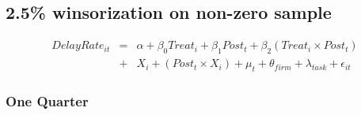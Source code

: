 \documentclass[
]{article}
\begin{document}
\hypertarget{winsorization-on-non-zero-sample}{%
\subsection{2.5\% winsorization on non-zero
sample}\label{winsorization-on-non-zero-sample}}

\[ \begin{aligned} DelayRate_{it} &=& \alpha+\beta_0 Treat_i + \beta_1 Post_t + \beta_2 (Treat_i \times Post_t)\\
&+&  X_i + (Post_t \times X_i) + \mu_t + \theta_{firm} + \lambda_{task}+ \epsilon_{it}
\end{aligned}\]

\hypertarget{one-quarter-4}{%
\subsubsection{One Quarter}\label{one-quarter-4}}
\end{document}
